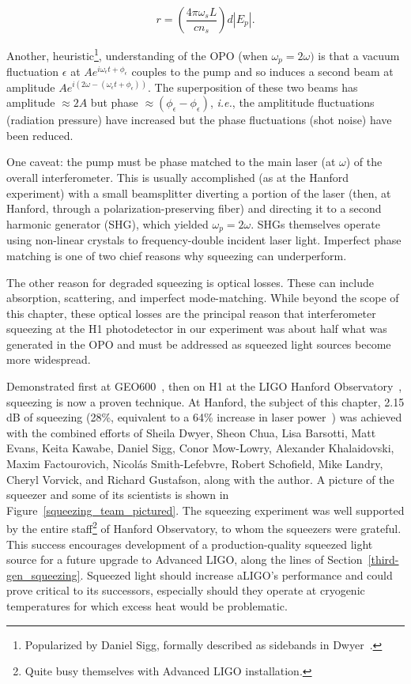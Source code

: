\begin{equation}
r = \left(\frac{4\pi \omega_s L}{c n_s} \right) d |E_p|.
\label{how_much_squeezing}
\end{equation} 

\noindent Another, heuristic\footnote{Popularized by Daniel Sigg, formally described as sidebands in Dwyer~\cite{DwyerThesis}.}, understanding of the OPO (when $\omega_p = 2\omega)$ is that a vacuum fluctuation $\epsilon$ at $A e^{i\omega_\epsilon t + \phi_\epsilon}$ couples to the pump and so induces a second beam at amplitude $A e^{i\left(2\omega - (\omega_\epsilon t + \phi_\epsilon)\right)}$.
The superposition of these two beams has amplitude $\approx 2 A$ but phase $\approx (\phi_\epsilon - \phi_\epsilon)$, \textit{i.e.}, the amplititude fluctuations (radiation pressure) have increased but the phase fluctuations (shot noise) have been reduced.

One caveat: the pump must be phase matched to the main laser (at $\omega$) of the overall interferometer.
This is usually accomplished (as at the Hanford experiment) with a small beamsplitter diverting a portion of the laser (then, at Hanford, through a polarization-preserving fiber) and directing it to a second harmonic generator (SHG), which yielded $\omega_p = 2\omega$.
SHGs themselves operate using non-linear crystals to frequency-double incident laser light.
Imperfect phase matching is one of two chief reasons why squeezing can underperform.

The other reason for degraded squeezing is optical losses.
These can include absorption, scattering, and imperfect mode-matching.
While beyond the scope of this chapter, these optical losses are the principal reason that interferometer squeezing at the H1 photodetector in our experiment was about half what was generated in the OPO and must be addressed as squeezed light sources become more widespread.

Demonstrated first at GEO600~\cite{GEO600NatureSqueezing}, then on H1 at the LIGO Hanford Observatory~\cite{BarsottiNatureSqueezing}, squeezing is now a proven technique.
At Hanford, the subject of this chapter, 2.15 dB of squeezing (28\%, equivalent to a 64\% increase in laser power~\cite{BarsottiNatureSqueezing}) was achieved with the combined efforts of Sheila Dwyer, Sheon Chua, Lisa Barsotti, Matt Evans, Keita Kawabe, Daniel Sigg, Conor Mow-Lowry, Alexander Khalaidovski, Maxim Factourovich, Nicol\'{a}s Smith-Lefebvre, Robert Schofield, Mike Landry, Cheryl Vorvick, and Richard Gustafson, along with the author.
A picture of the squeezer and some of its scientists is shown in Figure~\ref{squeezing_team_pictured}.
The squeezing experiment was well supported by the entire staff\footnote{Quite busy themselves with Advanced LIGO installation.} of Hanford Observatory, to whom the squeezers were grateful.
This success encourages development of a production-quality squeezed light source for a future upgrade to Advanced LIGO, along the lines of Section~\ref{third-gen_squeezing}.
Squeezed light should increase aLIGO's performance and could prove critical to its successors, especially should they operate at cryogenic temperatures for which excess heat would be problematic.

